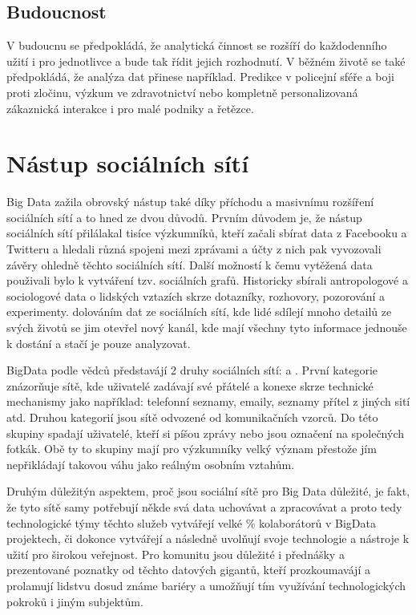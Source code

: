 \documentclass[thesis=M,czech]{FITthesis}[2012/06/26]
\begin{document}
\subsection{Budoucnost}
V budoucnu se předpokládá, že analytická činnost se rozšíří do každodenního užití i pro jednotlivce a bude tak řídit jejich rozhodnutí. V běžném životě se také předpokládá, že analýza dat přinese například. Predikce v policejní sféře a boji proti zločinu, výzkum ve zdravotnictví nebo kompletně personalizovaná zákaznická interakce i pro malé podniky a řetězce.

\section{Nástup sociálních sítí}
Big Data zažila obrovský nástup také díky příchodu a masivnímu rozšíření sociálních sítí a to hned ze dvou důvodů. Prvním důvodem je, že nástup sociálních sítí přilálakal tisíce výzkumníků, kteří začali sbírat data z Facebooku a Twitteru a hledali různá spojeni mezi zprávami a účty z nich pak vyvozovali závěry ohledně těchto sociálních sítí. Další možností k čemu vytěžená data použivali bylo k vytváření tzv. sociálních grafů. Historicky sbírali antropologové a sociologové data o lidských vztazích skrze dotazníky, rozhovory, pozorování a experimenty. dolováním dat ze sociálních sítí, kde lidé sdílejí mnoho detailů ze svých životů se jim otevřel nový kanál, kde mají všechny tyto informace jednouše k dostání a stačí je pouze analyzovat.

BigData podle vědců představájí 2 druhy sociálních sítí:  a . První kategorie znázorňuje sítě, kde uživatelé zadávají své přátelé a konexe skrze technické mechanismy jako například: telefonní seznamy, emaily, seznamy přítel z jiných sití atd. Druhou kategorií jsou sítě odvozené od komunikačních vzorců. Do této skupiny spadají uživatelé, kteří si píšou zprávy nebo jsou označení na společných fotkák. Obě ty to skupiny mají pro výzkumníky velký význam přestože jím nepřikládají takovou váhu jako reálným osobním vztahům. \cite{social}

Druhým důležitýn aspektem, proč jsou sociální sítě pro Big Data důležité, je fakt, že tyto sítě samy potřebují někde svá data uchovávat a zpracovávat a proto tedy technologické týmy těchto služeb vytvářejí velké \% kolaborátorů v BigData projektech, či dokonce vytvářejí a následně uvolňují svoje technologie a nástroje k užití pro širokou veřejnost. Pro komunitu jsou důležité i přednášky a prezentované poznatky od těchto datových gigantů, kteří prozkoumavájí a prolamují lidstvu dosud známe bariéry a umožňují tím využívání technologických pokroků i jiným subjektům. 
\end{document}
